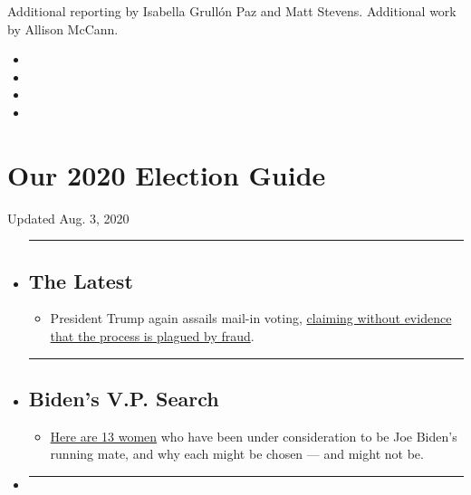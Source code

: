 Additional reporting by Isabella Grullón Paz and Matt Stevens.
Additional work by Allison McCann.

\begin{itemize}
\item
\item
\item
\item
\end{itemize}

\hypertarget{our-2020-election-guide}{%
\section{Our 2020 Election Guide}\label{our-2020-election-guide}}

Updated Aug. 3, 2020

\begin{itemize}
\item
  \begin{center}\rule{0.5\linewidth}{\linethickness}\end{center}

  \hypertarget{the-latest}{%
  \subsection{The Latest}\label{the-latest}}

  \begin{itemize}
  \tightlist
  \item
    President Trump again assails mail-in voting,
    \href{https://www.nytimes.com/2020/08/03/us/politics/trump-mail-in-voting.html?action=click\&pgtype=Article\&state=default\&region=BELOW_MAIN_CONTENT\&context=storylines_guide}{claiming
    without evidence that the process is plagued by fraud}.
  \end{itemize}
\item
  \begin{center}\rule{0.5\linewidth}{\linethickness}\end{center}

  \hypertarget{bidens-vp-search}{%
  \subsection{Biden's V.P. Search}\label{bidens-vp-search}}

  \begin{itemize}
  \tightlist
  \item
    \href{https://www.nytimes.com/article/biden-vice-president-2020.html?action=click\&pgtype=Article\&state=default\&region=BELOW_MAIN_CONTENT\&context=storylines_guide}{Here
    are 13 women} who have been under consideration to be Joe Biden's
    running mate, and why each might be chosen --- and might not be.
  \end{itemize}
\item
  \begin{center}\rule{0.5\linewidth}{\linethickness}\end{center}


\end{itemize}
